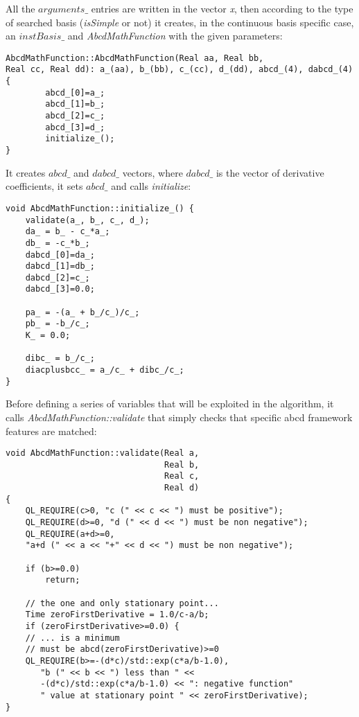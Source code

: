All the $arguments\_$ entries are written in the vector \textit{x}, then according to the type of searched basis (\textit{isSimple} or not) it creates, in the continuous basis specific case, an $instBasis\_$ and \textit{AbcdMathFunction} with the given parameters:

\begin{lstlisting}
AbcdMathFunction::AbcdMathFunction(Real aa, Real bb,
Real cc, Real dd): a_(aa), b_(bb), c_(cc), d_(dd), abcd_(4), dabcd_(4) 
{
        abcd_[0]=a_;
        abcd_[1]=b_;
        abcd_[2]=c_;
        abcd_[3]=d_;
        initialize_();
}
\end{lstlisting}

It creates $abcd\_$ and $dabcd\_$ vectors, where $dabcd\_$ is the vector of derivative coefficients, it sets $abcd\_$ and calls \textit{initialize}:

\begin{lstlisting}
void AbcdMathFunction::initialize_() {
    validate(a_, b_, c_, d_);
    da_ = b_ - c_*a_;
    db_ = -c_*b_;
    dabcd_[0]=da_;
    dabcd_[1]=db_;
    dabcd_[2]=c_;
    dabcd_[3]=0.0;

    pa_ = -(a_ + b_/c_)/c_;
    pb_ = -b_/c_;
    K_ = 0.0;

    dibc_ = b_/c_;
    diacplusbcc_ = a_/c_ + dibc_/c_;
}
\end{lstlisting}

Before defining a series of variables that will be exploited in the algorithm, it calls \textit{AbcdMathFunction::validate} that simply checks that specific abcd framework features are matched:

\begin{lstlisting}
void AbcdMathFunction::validate(Real a,
                                Real b,
                                Real c,
                                Real d) 
{
    QL_REQUIRE(c>0, "c (" << c << ") must be positive");
    QL_REQUIRE(d>=0, "d (" << d << ") must be non negative");
    QL_REQUIRE(a+d>=0,
    "a+d (" << a << "+" << d << ") must be non negative");

    if (b>=0.0)
        return;

    // the one and only stationary point...
    Time zeroFirstDerivative = 1.0/c-a/b;
    if (zeroFirstDerivative>=0.0) {
    // ... is a minimum
    // must be abcd(zeroFirstDerivative)>=0
    QL_REQUIRE(b>=-(d*c)/std::exp(c*a/b-1.0),
       "b (" << b << ") less than " <<
       -(d*c)/std::exp(c*a/b-1.0) << ": negative function"
       " value at stationary point " << zeroFirstDerivative);
}

\end{lstlisting}


